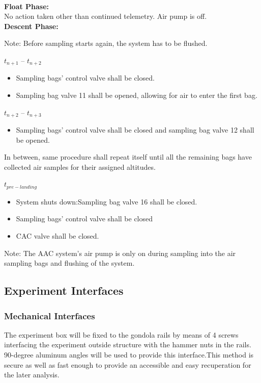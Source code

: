 \documentclass[a4paper,12pt,twoside]{article}
\begin{document}
\textbf{\\Float Phase:}\\
No action taken other than continued telemetry. Air pump is off.\\

\textbf{Descent Phase:}

Note: Before sampling starts again, the system has to be flushed. 

$t_{n+1}$ – $t_{n+2}$
\begin{itemize}
    \item Sampling bags' control valve shall be closed.
    \item Sampling bag valve 11 shall be opened, allowing for air to enter the first bag.
\end{itemize}

$t_{n+2}$ – $t_{n+3}$
\begin{itemize}
    \item Sampling bags' control valve shall be closed and sampling bag valve 12 shall be opened.
\end{itemize}

In between, same procedure shall repeat itself until all the remaining bags have collected air samples for their assigned altitudes.

$t_{pre-landing}$
\begin{itemize}
    \item System shuts down:Sampling bag valve 16 shall be closed.
    \item Sampling bags' control valve shall be closed
    \item CAC valve shall be closed.
\end{itemize}


Note: The AAC system's air pump is only on during sampling into the air sampling bags and flushing of the system.

\raggedbottom
\pagebreak
\subsection{Experiment Interfaces}

\subsubsection{Mechanical Interfaces}
The experiment box will be fixed to the gondola rails by means of 4 screws interfacing the experiment outside structure with the hammer nuts in the rails. 90-degree aluminum angles will be used to provide this interface.This method is secure as well as fast enough to provide an accessible and easy recuperation for the later analysis. 
\end{document}
